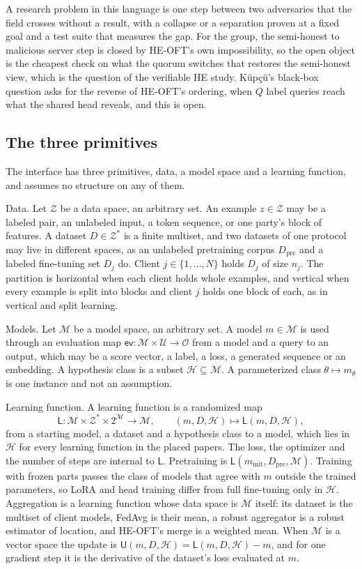 \documentclass{labreport}
\newcommand{\Z}{\mathcal{Z}}
\newcommand{\Mc}{\mathcal{M}}
\newcommand{\Lf}{\mathsf{L}}
\newcommand{\Hc}{\mathcal{H}}
\newcommand{\U}{\mathsf{U}}
\newcommand{\Dpre}{D_{\mathrm{pre}}}
\begin{document}
\lrchanges
A research problem in this language is one step between two adversaries that
the field crosses without a result, with a collapse or a separation proven at a
fixed goal and a test suite that measures the gap. For the group, the
semi-honest to malicious server step is closed by HE-OFT's own impossibility,
so the open object is the cheapest check on what the quorum switches that
restores the semi-honest view, which is the question of the verifiable HE
study. Küpçü's black-box question asks for the reverse of HE-OFT's ordering,
when $Q$ label queries reach what the shared head reveals, and this is open.

\lrmethod
\subsection*{The three primitives}
The interface has three primitives, data, a model space and a learning
function, and assumes no structure on any of them.

Data. Let $\Z$ be a data space, an arbitrary set. An example $z \in \Z$ may be a
labeled pair, an unlabeled input, a token sequence, or one party's block of
features. A dataset $D \in \Z^{*}$ is a finite multiset, and two datasets of one
protocol may live in different spaces, as an unlabeled pretraining corpus
$\Dpre$ and a labeled fine-tuning set $D_j$ do. Client $j \in \{1,\dots,N\}$
holds $D_j$ of size $n_j$. The partition is horizontal when each client holds
whole examples, and vertical when every example is split into blocks and client
$j$ holds one block of each, as in vertical and split learning.

Models. Let $\Mc$ be a model space, an arbitrary set. A model $m \in \Mc$ is
used through an evaluation map $\mathsf{ev} : \Mc \times \mathcal{U} \to
\mathcal{O}$ from a model and a query to an output, which may be a score vector,
a label, a loss, a generated sequence or an embedding. A hypothesis class is a
subset $\Hc \subseteq \Mc$. A parameterized class $\theta \mapsto m_\theta$ is
one instance and not an assumption.

Learning function. A learning function is a randomized map
\[
\Lf : \Mc \times \Z^{*} \times 2^{\Mc} \to \Mc, \qquad (m, D, \Hc) \mapsto \Lf(m, D, \Hc),
\]
from a starting model, a dataset and a hypothesis class to a model, which lies
in $\Hc$ for every learning function in the placed papers. The loss, the
optimizer and the number of steps are internal to $\Lf$. Pretraining is
$\Lf(m_{\mathrm{init}}, \Dpre, \Mc)$. Training with frozen parts passes the class
of models that agree with $m$ outside the trained parameters, so LoRA and head
training differ from full fine-tuning only in $\Hc$. Aggregation is a learning
function whose data space is $\Mc$ itself: its dataset is the multiset of client
models, FedAvg is their mean, a robust aggregator is a robust estimator of
location, and HE-OFT's merge is a weighted mean. When $\Mc$ is a vector space
the update is $\U(m,D,\Hc) = \Lf(m,D,\Hc) - m$, and for one gradient step it is
the derivative of the dataset's loss evaluated at $m$.
\end{document}
